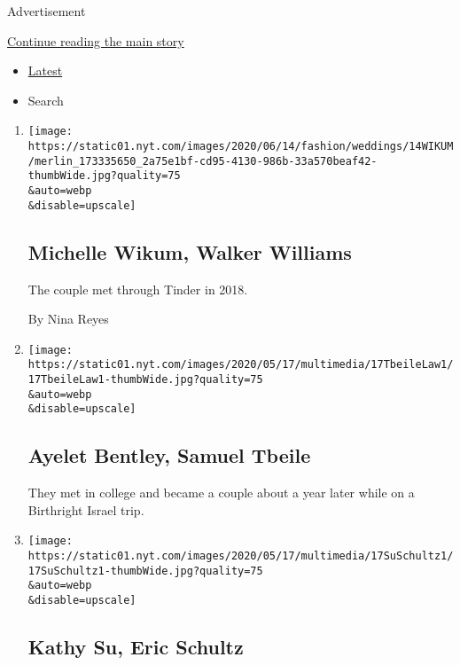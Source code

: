 Advertisement

\protect\hyperlink{after-subheader}{Continue reading the main story}

\begin{itemize}
\tightlist
\item
  \protect\hyperlink{stream-panel}{Latest}
\item
  Search
\end{itemize}

\begin{enumerate}
\def\labelenumi{\arabic{enumi}.}
\item
  \href{/2020/06/14/fashion/weddings/michelle-wikum-walker-williams.html}{}

  \texttt{[image: https://static01.nyt.com/images/2020/06/14/fashion/weddings/14WIKUM/merlin\_173335650\_2a75e1bf-cd95-4130-986b-33a570beaf42-thumbWide.jpg?quality=75\\\&auto=webp\\\&disable=upscale]}

  \hypertarget{michelle-wikum-walker-williams}{%
  \subsection{Michelle Wikum, Walker
  Williams}\label{michelle-wikum-walker-williams}}

  The couple met through Tinder in 2018.

  By Nina Reyes
\item
  \href{/2020/05/17/fashion/weddings/ayelet-bentley-samuel-tbeile.html}{}

  \texttt{[image: https://static01.nyt.com/images/2020/05/17/multimedia/17TbeileLaw1/17TbeileLaw1-thumbWide.jpg?quality=75\\\&auto=webp\\\&disable=upscale]}

  \hypertarget{ayelet-bentley-samuel-tbeile}{%
  \subsection{Ayelet Bentley, Samuel
  Tbeile}\label{ayelet-bentley-samuel-tbeile}}

  They met in college and became a couple about a year later while on a
  Birthright Israel trip.
\item
  \href{/2020/05/17/fashion/weddings/kathy-su-eric-schultz.html}{}

  \texttt{[image: https://static01.nyt.com/images/2020/05/17/multimedia/17SuSchultz1/17SuSchultz1-thumbWide.jpg?quality=75\\\&auto=webp\\\&disable=upscale]}

  \hypertarget{kathy-su-eric-schultz}{%
  \subsection{Kathy Su, Eric Schultz}\label{kathy-su-eric-schultz}}


\end{enumerate}
